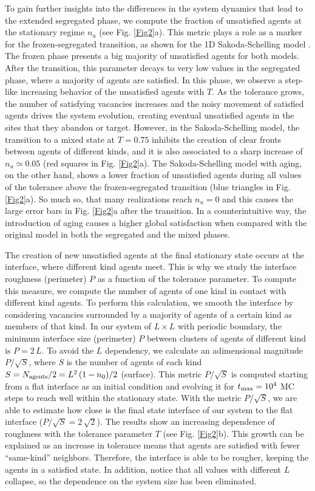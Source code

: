 To gain further insights into the differences in the system dynamics that lead to the extended segregated phase, we compute the fraction of unsatisfied agents at the stationary regime $n_u$ (see Fig. \ref{Fig2}a). This metric plays a role as a marker for the frozen-segregated transition, as shown for the 1D Sakoda-Schelling model \cite{Dall_Asta_2008}. The frozen phase presents a big majority of unsatisfied agents for both models. After the transition, this parameter decays to very low values in the segregated phase, where a majority of agents are satisfied. In this phase, we observe a step-like increasing behavior of the unsatisfied agents with $T$. As the tolerance grows, the number of satisfying vacancies increases and the noisy movement of satisfied agents drives the system evolution, creating eventual unsatisfied agents in the sites that they abandon or target. However, in the Sakoda-Schelling model, the transition to a mixed state at $T = 0.75$ inhibits the creation of clear fronts between agents of different kinds, and it is also associated to a sharp increase of $n_u \simeq 0.05 $ (red squares in Fig. \ref{Fig2}a). The Sakoda-Schelling model with aging, on the other hand, shows a lower fraction of unsatisfied agents during all values of the tolerance above the frozen-segregated transition (blue triangles in Fig. \ref{Fig2}a). So much so, that many realizations reach $n_u = 0$ and this causes the large error bars in Fig. \ref{Fig2}a after the transition. In a counterintuitive way, the introduction of aging causes a higher global satisfaction when compared with the original model in both the segregated and the mixed phases.

The creation of new unsatisfied agents at the final stationary state occurs at the interface, where different kind agents meet. This is why we study the interface roughness (perimeter) $P$ as a function of the tolerance parameter. To compute this measure, we compute the number of agents of one kind in contact with different kind agents. To perform this calculation, we smooth the interface by considering vacancies surrounded by a majority of agents of a certain kind as members of that kind. In our system of $L \times L$ with periodic boundary, the minimum interface size (perimeter) $P$ between clusters of agents of different kind is $P = 2 \, L$. To avoid the $L$ dependency, we calculate an adimensional magnitude $P/\sqrt{S}$, where $S$ is the number of agents of each kind $S = N_{\rm{agents}}/2 = L^2 \, (1 - n_0 )/2 $ (surface). This metric $P/\sqrt{S}$ is computed starting from a flat interface as an initial condition and evolving it for $t_{\rm{max}} = 10^4$ MC steps to reach well within the stationary state. With the metric $P/\sqrt{S}$, we are able to estimate how close is the final state interface of our system to the flat interface ($P/\sqrt{S} = 2 \, \sqrt{2}$). The results show an increasing dependence of roughness with the tolerance parameter $T$ (see Fig. \ref{Fig2}b). This growth can be explained as an increase in tolerance means that agents are satisfied with fewer ``same-kind'' neighbors. Therefore, the interface is able to be rougher, keeping the agents in a satisfied state. In addition, notice that all values with different $L$ collapse, so the dependence on the system size has been eliminated. 

